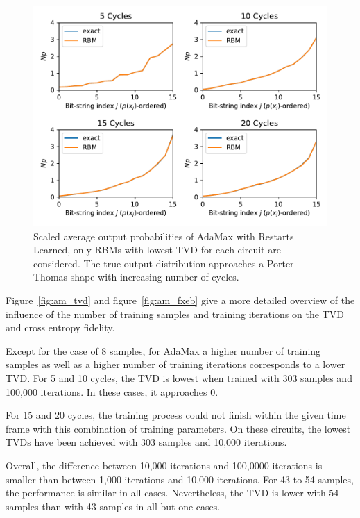 \begin{figure}[H]
  \centering
  \includegraphics[width=\textwidth]{figures/results/AM-restarts-learned/avgBestPDF.pdf}
  \caption[Averaged best performing scaled output probabilities of AdaMax with Restarts Learned]{
    Scaled average output probabilities of AdaMax with Restarts Learned, only RBMs with lowest
    TVD for each circuit are considered. The true 
    output distribution approaches a Porter-Thomas shape with increasing number of cycles.}
  \label{fig:am_avgBestPDF}
\end{figure}

Figure~\ref{fig:am_tvd} and figure~\ref{fig:am_fxeb} give a more detailed overview of the influence of the 
number of training samples and training iterations on the TVD and cross entropy fidelity.

Except for the case of 8 samples, for AdaMax a higher number of training samples as well as a higher 
number of training iterations corresponds to a lower TVD. For 5 and 10 cycles, the TVD is lowest
when trained with 303 samples and 100,000 iterations. In these cases, it approaches 0.

For 15 and 20 cycles, the training process could not finish
within the given time frame with this combination of training parameters. On these circuits, the lowest TVDs have been achieved with 303 samples 
and 10,000 iterations.

Overall, the difference between 10,000 iterations and 100,0000 iterations is smaller than between 
1,000 iterations and 10,000 iterations. For 43 to 54 samples, the performance is similar in all cases.
Nevertheless, the TVD is lower with 54 samples than with 43 samples in all but one cases.

